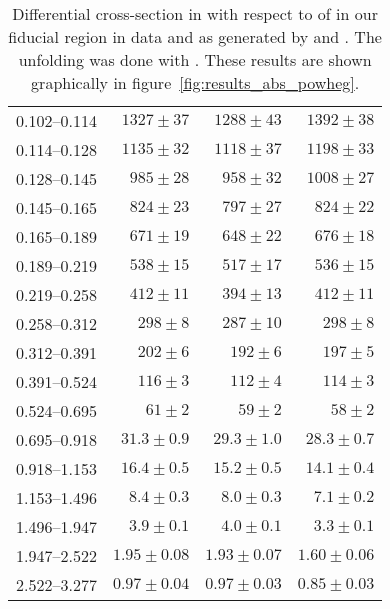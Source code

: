 \begin{table}
\begin{center}
\begin{tabular}{@{}l r r r@{}}
            0.102--0.114  &  $1327  \pm  37$    &  $1288  \pm  43$    &  $1392  \pm  38$    \\
            0.114--0.128  &  $1135  \pm  32$    &  $1118  \pm  37$    &  $1198  \pm  33$    \\
            0.128--0.145  &  $985   \pm  28$    &  $958   \pm  32$    &  $1008  \pm  27$    \\
            0.145--0.165  &  $824   \pm  23$    &  $797   \pm  27$    &  $824   \pm  22$    \\
            0.165--0.189  &  $671   \pm  19$    &  $648   \pm  22$    &  $676   \pm  18$    \\
            0.189--0.219  &  $538   \pm  15$    &  $517   \pm  17$    &  $536   \pm  15$    \\
            0.219--0.258  &  $412   \pm  11$    &  $394   \pm  13$    &  $412   \pm  11$    \\
            0.258--0.312  &  $298   \pm  8$     &  $287   \pm  10$    &  $298   \pm  8$     \\
            0.312--0.391  &  $202   \pm  6$     &  $192   \pm  6$     &  $197   \pm  5$     \\
            0.391--0.524  &  $116   \pm  3$     &  $112   \pm  4$     &  $114   \pm  3$     \\
            0.524--0.695  &  $61    \pm  2$     &  $59    \pm  2$     &  $58    \pm  2$     \\
            0.695--0.918  &  $31.3  \pm  0.9$   &  $29.3  \pm  1.0$   &  $28.3  \pm  0.7$   \\
            0.918--1.153  &  $16.4  \pm  0.5$   &  $15.2  \pm  0.5$   &  $14.1  \pm  0.4$   \\
            1.153--1.496  &  $8.4   \pm  0.3$   &  $8.0   \pm  0.3$   &  $7.1   \pm  0.2$   \\
            1.496--1.947  &  $3.9   \pm  0.1$   &  $4.0   \pm  0.1$   &  $3.3   \pm  0.1$   \\
            1.947--2.522  &  $1.95  \pm  0.08$  &  $1.93  \pm  0.07$  &  $1.60  \pm  0.06$  \\
            2.522--3.277  &  $0.97  \pm  0.04$  &  $0.97  \pm  0.03$  &  $0.85  \pm  0.03$  \\
            \bottomrule
        \end{tabular}
    \end{center}
    \caption[
        Differential cross-section in \pb with respect to \phistar of \Ztoee
        with \POWHEG unfolding.
    ]{
        Differential cross-section in \pb with respect to \phistar of \Ztoee in
        our fiducial region in data and as generated by \MADGRAPH and \POWHEG.
        The unfolding was done with \POWHEG. These results are shown
        graphically in figure~\ref{fig:results_abs_powheg}.
    }
    \label{tab:results_abs_powheg}
\end{table}
